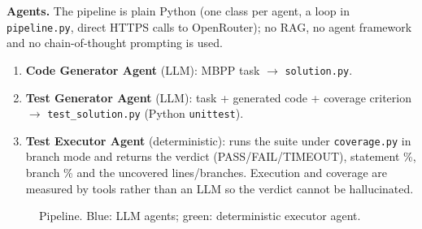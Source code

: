 \documentclass[11pt,a4paper]{article}
\begin{document}
\textbf{Agents.} The pipeline is plain Python (one class per agent, a loop in
\texttt{pipeline.py}, direct HTTPS calls to OpenRouter); no RAG, no agent framework
and no chain-of-thought prompting is used.
\begin{enumerate}
  \item \textbf{Code Generator Agent} (LLM): MBPP task $\rightarrow$ \texttt{solution.py}.
  \item \textbf{Test Generator Agent} (LLM): task + generated code + coverage criterion
        $\rightarrow$ \texttt{test\_solution.py} (Python \texttt{unittest}).
  \item \textbf{Test Executor Agent} (deterministic): runs the suite under
        \texttt{coverage.py} in branch mode and returns the verdict
        (PASS/FAIL/TIMEOUT), statement \%, branch \% and the uncovered lines/branches.
        Execution and coverage are measured by tools rather than an LLM so the verdict cannot be hallucinated.
\end{enumerate}

\begin{figure}[H]
\centering
{}
\caption{Pipeline. Blue: LLM agents; green: deterministic executor agent.}
\end{figure}
\end{document}
